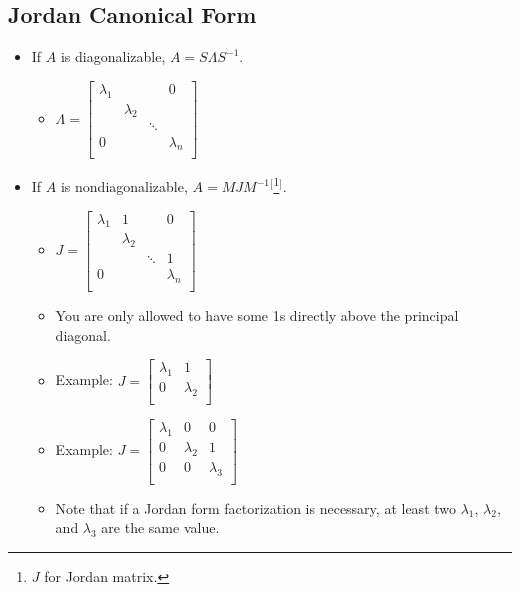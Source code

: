 \documentclass{article}
\begin{document}
\subsection*{Jordan Canonical Form}
\begin{itemize}
    \item {}If $A$ is diagonalizable, $A=S\Lambda S^{-1}$.
    \begin{itemize}
        \item $
            \Lambda=
            \begin{bmatrix}
                \lambda_1 & & & 0\\
                 & \lambda_2 & & \\
                 & & \ddots & \\
                0 & & & \lambda_n\\
            \end{bmatrix}
        $
    \end{itemize}
    \item If $A$ is nondiagonalizable, $A=MJM^{-1}$$^[$\footnote{$J$ for Jordan matrix.}$^]$.
    \begin{itemize}
        \item $
            J=
            \begin{bmatrix}
                \lambda_1 & 1 & & 0\\
                 & \lambda_2 & &\\
                 &  & \ddots & 1\\
                0 &  &  & \lambda_n\\
            \end{bmatrix}
        $
        \item You are only allowed to have some 1s directly above the principal diagonal.
        \item Example: $
            J =
            \begin{bmatrix}
                \lambda_1 & 1\\
                0 & \lambda_2\\
            \end{bmatrix}
        $
        \item Example: $
            J =
            \begin{bmatrix}
                \lambda_1 & 0 & 0\\
                0 & \lambda_2 & 1\\
                0 & 0 & \lambda_3\\
            \end{bmatrix}
        $
        \item Note that if a Jordan form factorization is necessary, at least two $\lambda_1$, $\lambda_2$, and $\lambda_3$ are the same value. 
    \end{itemize}
\end{itemize}
\end{document}
